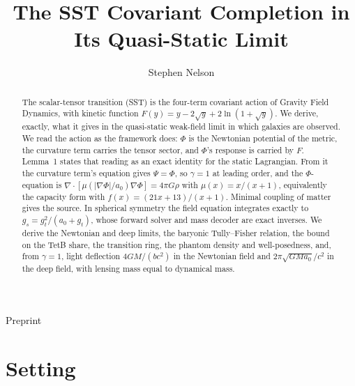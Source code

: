 \documentclass[twocolumn]{iopjournal}
\renewcommand{\articletype}[1]{%
  {\vspace*{-8mm}\noindent \Large \sf Preprint}\par
  \vspace*{6mm}\noindent{\scriptsize \sf{\bfseries \MakeUppercase{#1}}}}
\begin{document}
\articletype{Supplementary Material}

\title{The SST Covariant Completion in Its Quasi-Static Limit}

\author{Stephen Nelson}



\begin{abstract}
The scalar-tensor transition (SST) is the four-term covariant action
of Gravity Field Dynamics, with kinetic function
$F(y) = y - 2\sqrt y + 2\ln(1+\sqrt y)$. We derive, exactly, what it
gives in the quasi-static weak-field limit in which galaxies are
observed. We read the action as the framework does: $\Phi$ is the
Newtonian potential of the metric, the curvature term carries the
tensor sector, and $\Phi$'s response is carried by $F$. Lemma~1 states
that reading as an exact identity for the static Lagrangian. From it
the curvature term's equation gives $\Psi = \Phi$, so $\gamma = 1$ at
leading order, and the $\Phi$-equation is
$\nabla\cdot[\mu(|\nabla\Phi|/a_0)\nabla\Phi] = 4\pi G\rho$ with
$\mu(x) = x/(x+1)$, equivalently the capacity form with
$f(x) = (21x+13)/(x+1)$. Minimal coupling of matter gives the source.
In spherical symmetry the field equation integrates exactly to
$g_s = g_t^2/(a_0 + g_t)$, whose forward solver and mass decoder are
exact inverses. We derive the Newtonian and deep limits, the baryonic
Tully--Fisher relation, the bound on the TetB share, the transition
ring, the phantom density and well-posedness, and, from $\gamma = 1$,
light deflection $4GM/(bc^2)$ in the Newtonian field and
$2\pi\sqrt{GMa_0}/c^2$ in the deep field, with lensing mass equal to
dynamical mass.
\end{abstract}



\section*{Setting}
\end{document}
